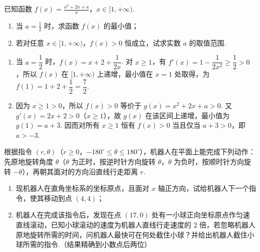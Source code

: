 \begin{problem}
已知函数 \(f(x) = \frac{x^2 + 2x + a}{x}\)，\(x \in [1, +\infty)\).
\begin{enumerate}
\item 当 \(a = \frac{1}{2}\) 时，求函数 \(f(x)\) 的最小值；
\item 若对任意 \(x \in [1, +\infty)\)，\(f(x) > 0\) 恒成立，试求实数 \(a\) 的取值范围.
\end{enumerate}
\end{problem}

\begin{solution}
\begin{enumerate}
\item 当 \(a=\dfrac{1}{2}\) 时，\(f(x)=x+2+\dfrac{1}{2x}\). 对 \(x\geqslant1\)，有 \(f'(x)=1-\dfrac{1}{2x^2}\geqslant\dfrac{1}{2}>0\)，所以 \(f(x)\) 在 \([1,+\infty)\) 上递增，最小值在 \(x=1\) 处取得，为 \(f(1)=1+2+\dfrac{1}{2}=\dfrac{7}{2}\).
\item 因为 \(x\geqslant1>0\)，所以 \(f(x)>0\) 等价于 \(g(x)=x^2+2x+a>0\). 又 \(g'(x)=2x+2>0\)（\(x\geqslant1\)），故 \(g(x)\) 在该区间上递增，最小值为 \(g(1)=a+3\). 因而对所有 \(x\geqslant1\) 恒有 \(f(x)>0\) 当且仅当 \(a+3>0\)，即 \(a>-3\).
\end{enumerate}
\end{solution}

\begin{problem}
根据指令 \((r,\theta)\)（\(r \geqslant 0\)，\(-180^{\circ} \leqslant \theta \leqslant 180^{\circ}\)），机器人在平面上能完成下列动作：先原地旋转角度 \(\theta\)（\(\theta\) 为正时，按逆时针方向旋转 \(\theta\)，\(\theta\) 为负时，按顺时针方向旋转 \(-\theta\)），再朝其面对的方向沿直线行走距离 \(r\).
\begin{enumerate}
\item 现机器人在直角坐标系的坐标原点，且面对 \(x\) 轴正方向，试给机器人下一个指令，使其移动到点 \((4,4)\)；
\item 机器人在完成该指令后，发现在点 \((17,0)\) 处有一小球正向坐标原点作匀速直线滚动，已知小球滚动的速度为机器人直线行走速度的 2 倍，若忽略机器人原地旋转所需的时间，问机器人最快可在何处截住小球？并给出机器人截住小球所需的指令.（结果精确到小数点后两位）
\end{enumerate}

\end{problem}

